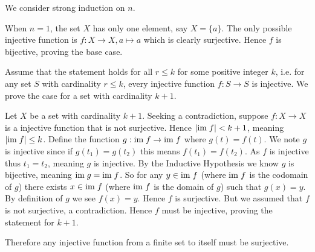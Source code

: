 \begin{questions}
    \item We consider strong induction on $n$.

    When $n = 1$, the set $X$ has only one element, say $X = \{a\}$. The only possible injective function is $f: X \to X, a \mapsto a$ which is clearly surjective. Hence $f$ is bijective, proving the base case.

    Assume that the statement holds for all $r \leq k$ for some positive integer $k$, i.e. for any set $S$ with cardinality $r \leq k$, every injective function $f: S \to S$ is injective. We prove the case for a set with cardinality $k + 1$.

    Let $X$ be a set with cardinality $k + 1$. Seeking a contradiction, suppose $f: X \to X$ is a injective function that is not surjective. Hence $|\mathrm{im}\; f| < k + 1$, meaning $|\mathrm{im}\; f| \leq k$. Define the function $g: \mathrm{im}\; f \to \mathrm{im}\; f$ where $g(t) = f(t)$. We note $g$ is injective since if $g(t_1) = g(t_2)$ this means $f(t_1) = f(t_2)$. As $f$ is injective thus $t_1 = t_2$, meaning $g$ is injective. By the Inductive Hypothesis we know $g$ is bijective, meaning $\mathrm{im}\; g = \mathrm{im}\; f$. So for any $y \in \mathrm{im}\; f$ (where $\mathrm{im}\; f$ is the codomain of $g$) there exists $x \in \mathrm{im}\; f$ (where $\mathrm{im}\; f$ is the domain of $g$) such that $g(x) = y$. By definition of $g$ we see $f(x) = y$. Hence $f$ is surjective. But we assumed that $f$ is not surjective, a contradiction. Hence $f$ must be injective, proving the statement for $k + 1$.

    Therefore any injective function from a finite set to itself must be surjective.
\end{questions}
